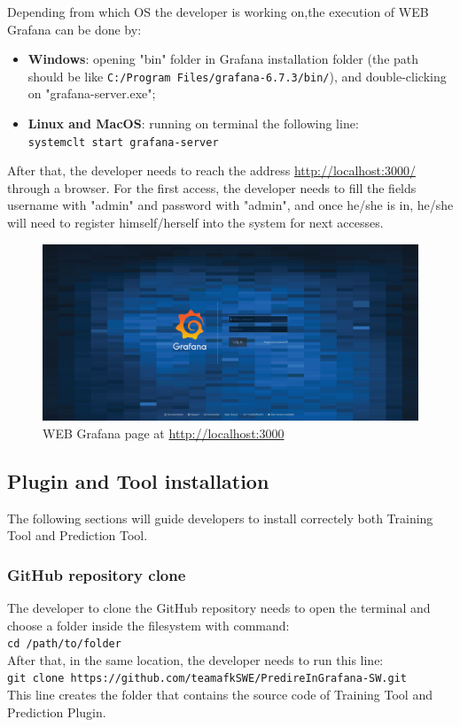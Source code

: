 Depending from which OS the developer is working on,the execution of WEB Grafana can be done by:
\begin{itemize}
\item \textbf{Windows}: opening "bin" folder in Grafana installation folder
(the path should be like \texttt{C:/Program Files/grafana-6.7.3/bin/}), and double-clicking on "grafana-server.exe";
\item \textbf{Linux and MacOS}: running on terminal the following line:\\
\texttt{systemclt start grafana-server}\\
\end{itemize} 
After that, the developer needs to reach the address \url{http://localhost:3000/} through a browser. For the first access, the developer needs to fill the fields username with "admin" and password with "admin", and once he/she is in, he/she will need to register himself/herself into the system for next accesses.

\begin{figure}[H]
\centering
\includegraphics[scale=0.25]{./img/web_grafana_login.png}
\caption{WEB Grafana page at \url{http://localhost:3000}}
\end{figure}
\subsection{Plugin and Tool installation}
The following sections will guide developers to install correctely both Training Tool and Prediction Tool.
\subsubsection{GitHub repository clone}
The developer to clone the GitHub repository needs to open the terminal and choose a folder inside the filesystem with command: \\
\texttt{cd /path/to/folder}\\
After that, in the same location, the developer needs to run  this line:\\
\texttt{git clone https://github.com/teamafkSWE/PredireInGrafana-SW.git}\\
This line creates the folder that contains the source code of Training Tool and Prediction Plugin.\mbox \\

